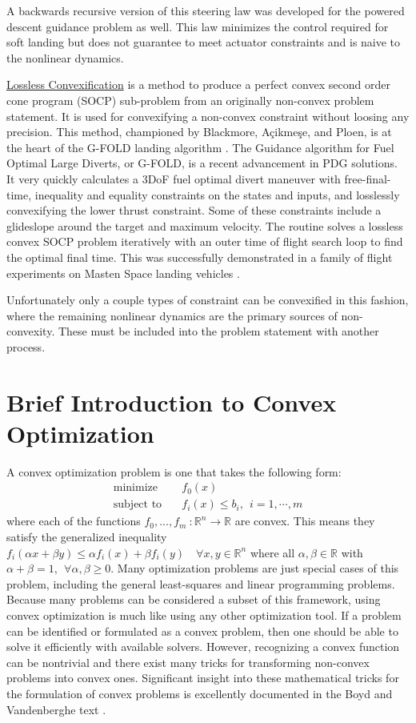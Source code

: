 A backwards recursive version of this steering law was developed for the powered descent guidance problem as well. This law minimizes the control required for soft landing but does not guarantee to meet actuator constraints and is naive to the nonlinear dynamics.

\underline{Lossless Convexification} is a method to produce a perfect convex second order cone program (SOCP) sub-problem from an originally non-convex problem statement. It is used for convexifying a non-convex constraint without loosing any precision. This method, championed by Blackmore, Açikmeşe, and Ploen, is at the heart of the G-FOLD landing algorithm \cite{blackmore2010minimum} \cite{accikmecse2011lossless} \cite{acikmese2012g}. The Guidance algorithm for Fuel Optimal Large Diverts, or G-FOLD, is a recent advancement in PDG solutions. It very quickly calculates a 3DoF fuel optimal divert maneuver with free-final-time, inequality and equality constraints on the states and inputs, and losslessly convexifying the lower thrust constraint. Some of these constraints include a glideslope around the target and maximum velocity. The routine solves a lossless convex SOCP problem iteratively with an outer time of flight search loop to find the optimal final time. This was successfully demonstrated in a family of flight experiments on Masten Space landing vehicles \cite{acikmese2013flight} \cite{scharf2014adapt}.

Unfortunately only a couple types of constraint can be convexified in this fashion, where the remaining nonlinear dynamics are the primary sources of non-convexity. These must be included into the problem statement with another process.

\section{Brief Introduction to Convex Optimization}
A convex optimization problem is one that takes the following form:
\begin{align*}
	\text{minimize} \quad & f_0(x) \\ 
	\text{subject to} \quad & f_i(x) \leq b_i, \ \ i = 1, \cdots, m
\end{align*}
where each of the functions $f_0,...,f_m \ :\mathbb{R}^n \rightarrow \mathbb{R}$ are convex. This means they satisfy the generalized inequality $f_i(\alpha x + \beta y) \leq \alpha f_i(x) + \beta f_i(y) \quad \forall x, y \in \mathbb{R}^n$ where all $\alpha, \beta \in \mathbb{R}$ with $\alpha + \beta = 1,\ \ \forall \alpha,\beta \geq 0$. Many optimization problems are just special cases of this problem, including the general least-squares and linear programming problems. Because many problems can be considered a subset of this framework, using convex optimization is much like using any other optimization tool. If a problem can be identified or formulated as a convex problem, then one should be able to solve it efficiently with available solvers. However, recognizing a convex function can be nontrivial and there exist many tricks for transforming non-convex problems into convex ones. Significant insight into these mathematical tricks for the formulation of convex problems is excellently documented in the Boyd and Vandenberghe text \cite{boyd2004convex}.

